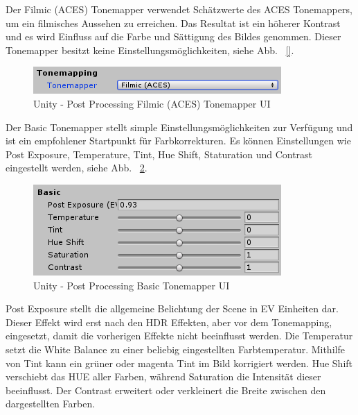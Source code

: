 Der Filmic (ACES) Tonemapper verwendet Schätzwerte  des ACES Tonemappers, um ein filmisches Aussehen zu erreichen.
Das Resultat ist ein höherer Kontrast und es wird Einfluss auf die Farbe und Sättigung des Bildes genommen.
Dieser Tonemapper besitzt keine Einstellungsmöglichkeiten, siehe Abb. ~\ref{}.
\begin {figure}
    \centering
    \includegraphics[scale=0.9]{pics/unity-post-processing-color-grading-filmic}
    \caption{Unity - Post Processing Filmic (ACES) Tonemapper UI}
    \label{fig:unity-post-processing-filmic-aces-tonemapper-ui}
\end {figure}

Der Basic Tonemapper stellt simple Einstellungsmöglichkeiten zur Verfügung und ist ein empfohlener Startpunkt für Farbkorrekturen.
Es können Einstellungen wie Post Exposure, Temperature, Tint, Hue Shift, Staturation und Contrast eingestellt werden, siehe Abb. ~\ref{fig:unity-post-processing-basic-tonemapper-ui}.
\begin {figure}
    \centering
    \includegraphics[scale=0.9]{pics/unity-post-processing-color-grading-basicTonemapper}
    \caption{Unity - Post Processing Basic Tonemapper UI}
    \label{fig:unity-post-processing-basic-tonemapper-ui}
\end {figure}

Post Exposure stellt die allgemeine Belichtung der Scene in EV Einheiten dar.
Dieser Effekt wird erst nach den HDR Effekten, aber vor dem Tonemapping, eingesetzt, damit die vorherigen Effekte nicht beeinflusst werden.
Die Temperatur setzt die White Balance zu einer beliebig eingestellten Farbtemperatur.
Mithilfe von Tint kann ein grüner oder magenta Tint im Bild korrigiert werden.
Hue Shift verschiebt das HUE aller Farben, während Saturation die Intensität dieser beeinflusst.
Der Contrast erweitert oder verkleinert die Breite zwischen den dargestellten Farben.

